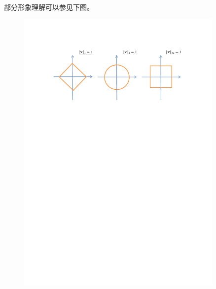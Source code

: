 ﻿\documentclass[hyperref,12pt]{ctexart}
\begin{document}
部分形象理解可以参见下图。
\begin{figure}
\includegraphics[width=0.9\textwidth]{norm.pdf}
\end{figure}
\end{document}
